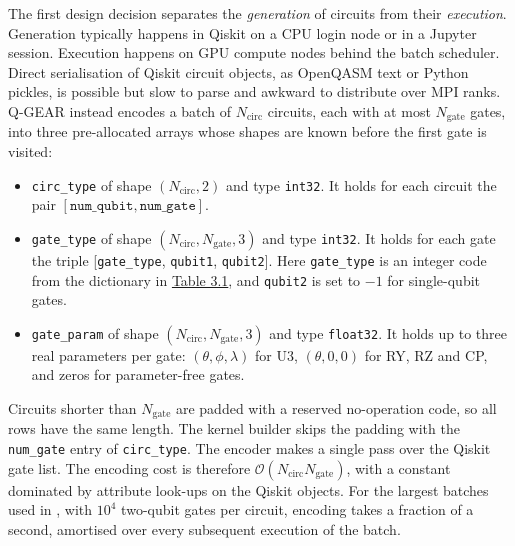 \documentclass{report}
\theoremstyle{plain}
\theoremstyle{definition}
\theoremstyle{remark}
\newcommand{\bigO}[1]{\mathcal{O}\!\left(#1\right)}
\begin{document}
The first design decision separates the \emph{generation} of circuits from their \emph{execution}. Generation typically happens in Qiskit on a CPU login node or in a Jupyter session. Execution happens on GPU compute nodes behind the batch scheduler. Direct serialisation of Qiskit circuit objects, as OpenQASM text or Python pickles, is possible but slow to parse and awkward to distribute over MPI ranks. Q-GEAR instead encodes a batch of $N_{\mathrm{circ}}$ circuits, each with at most $N_{\mathrm{gate}}$ gates, into three pre-allocated arrays whose shapes are known before the first gate is visited:
\begin{itemize}
  \item \texttt{circ\_type} of shape $(N_{\mathrm{circ}},2)$ and type \texttt{int32}. It holds for each circuit the pair $[\texttt{num\_qubit},\texttt{num\_gate}]$.
  \item \texttt{gate\_type} of shape $(N_{\mathrm{circ}},N_{\mathrm{gate}},3)$ and type \texttt{int32}. It holds for each gate the triple [\texttt{gate\_type}, \texttt{qubit1}, \texttt{qubit2}]. Here \texttt{gate\_type} is an integer code from the dictionary in \hyperref[tab:qgear:gates]{Table 3.1}, and \texttt{qubit2} is set to $-1$ for single-qubit gates.
  \item \texttt{gate\_param} of shape $(N_{\mathrm{circ}},N_{\mathrm{gate}},3)$ and type \texttt{float32}. It holds up to three real parameters per gate: $(\theta,\phi,\lambda)$ for U3, $(\theta,0,0)$ for RY, RZ and CP, and zeros for parameter-free gates.
\end{itemize}
Circuits shorter than $N_{\mathrm{gate}}$ are padded with a reserved no-operation code, so all rows have the same length. The kernel builder skips the padding with the \texttt{num\_gate} entry of \texttt{circ\_type}. The encoder makes a single pass over the Qiskit gate list. The encoding cost is therefore $\bigO{N_{\mathrm{circ}}N_{\mathrm{gate}}}$, with a constant dominated by attribute look-ups on the Qiskit objects. For the largest batches used in \cite{guo2025qgear}, with $10^{4}$ two-qubit gates per circuit, encoding takes a fraction of a second, amortised over every subsequent execution of the batch.
\end{document}
